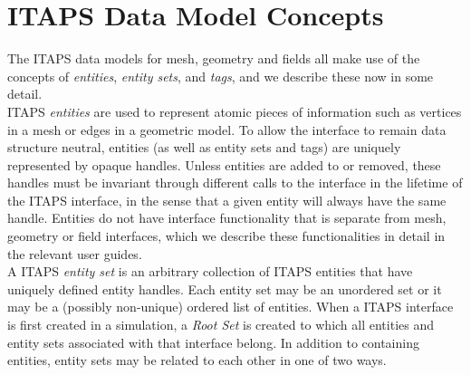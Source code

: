 \documentclass{article}
\begin{document}
\section{ITAPS Data Model Concepts}

The ITAPS data models for mesh, geometry and fields all make use 
of the concepts of \textit{entities}, \textit{entity sets}, and \textit{tags}, 
and we describe these now in some detail.\\

ITAPS \textit{entities} are used to represent atomic pieces of information 
such as vertices in a mesh or edges in a geometric model. To 
allow the interface to remain data structure neutral, entities 
(as well as entity sets and tags) are uniquely represented by 
opaque handles. Unless entities are added to or removed, these 
handles must be invariant through different calls to the interface 
in the lifetime of the ITAPS interface, in the sense that a given 
entity will always have the same handle. Entities do not have 
interface functionality that is separate from mesh, geometry 
or field interfaces, which we describe these functionalities 
in detail in the relevant user guides.\\


A ITAPS \textit{entity set} is an arbitrary collection of ITAPS entities 
that have uniquely defined entity handles. Each entity set may 
be an unordered set or it may be a (possibly non-unique) ordered 
list of entities. When a ITAPS interface is first created in a 
simulation, a \textit{Root Set} is created to which all entities and 
entity sets associated with that interface belong. In addition 
to containing entities, entity sets may be related to each other 
in one of two ways.
\end{document}
